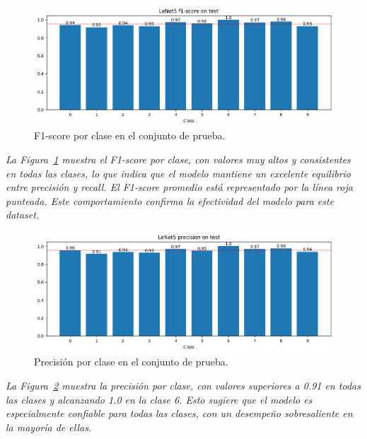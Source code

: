 \documentclass[conference]{IEEEtran}
\begin{document}
\begin{figure}[H]
    \centering
    \includegraphics[width=0.95\linewidth]{graphics-raw/raw-f1score-test.png}
    \caption{F1-score por clase en el conjunto de prueba.}
    \label{fig:raw-f1score-test}
\end{figure}
\noindent\textit{
La Figura~\ref{fig:raw-f1score-test} muestra el F1-score por clase, con valores muy altos y consistentes en todas las clases, lo que indica que el modelo mantiene un excelente equilibrio entre precisión y recall. El F1-score promedio está representado por la línea roja punteada. Este comportamiento confirma la efectividad del modelo para este dataset.
}

\begin{figure}[H]
    \centering
    \includegraphics[width=0.95\linewidth]{graphics-raw/raw-precision-test.png}
    \caption{Precisión por clase en el conjunto de prueba.}
    \label{fig:raw-precision-test}
\end{figure}
\noindent\textit{
La Figura~\ref{fig:raw-precision-test} muestra la precisión por clase, con valores superiores a 0.91 en todas las clases y alcanzando 1.0 en la clase 6. Esto sugiere que el modelo es especialmente confiable para todas las clases, con un desempeño sobresaliente en la mayoría de ellas.
}
\end{document}
